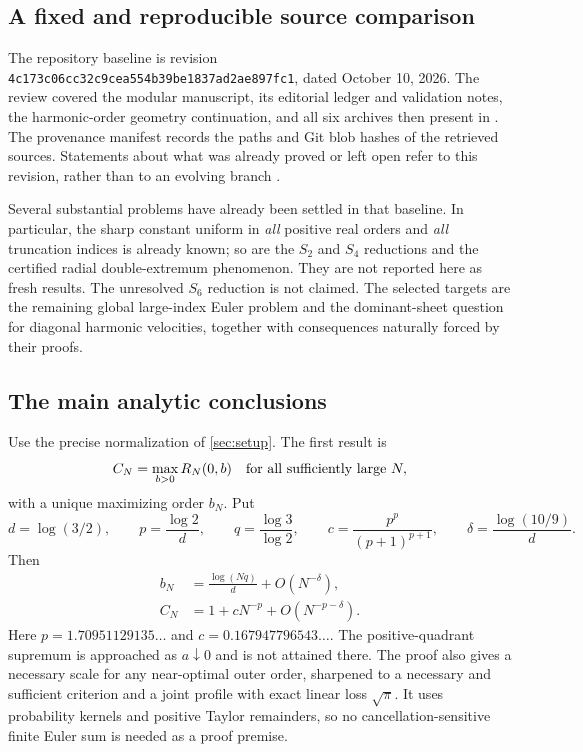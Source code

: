 \subsection{A fixed and reproducible source comparison}

The repository baseline is revision
\texttt{4c173c06cc32c9cea554b39be1837ad2ae897fc1},
dated October 10, 2026. The review covered the modular manuscript,
its editorial ledger and validation notes, the harmonic-order geometry
continuation, and all six archives then present in .
The provenance manifest records the paths and Git blob hashes of the
retrieved sources. Statements about what was already proved or left
open refer to this revision, rather than to an evolving branch
\cite{ProveItSnapshot,HarmonicBaseline,UniformBoundsIncoming,SharpEulerIncoming}.

Several substantial problems have already been settled in that baseline.
In particular, the sharp constant uniform in \emph{all} positive real
orders and \emph{all} truncation indices is already known; so are the
$S_2$ and $S_4$ reductions and the certified radial double-extremum
phenomenon. They are not reported here as fresh results. The unresolved
$S_6$ reduction is not claimed. The selected targets are the remaining
global large-index Euler problem and the dominant-sheet question for
diagonal harmonic velocities, together with consequences naturally
forced by their proofs.

\subsection{The main analytic conclusions}

Use the precise normalization of \cref{sec:setup}. The first result is
\[
 C_N=\max_{b>0}R_N(0,b)\quad\hbox{for all sufficiently large }N,
\]
with a unique maximizing order $b_N$. Put
\[
 d=\log(3/2),\qquad p=\frac{\log2}{d},\qquad
 q=\frac{\log3}{\log2},\qquad
 c=\frac{p^p}{(p+1)^{p+1}},\qquad
 \delta=\frac{\log(10/9)}d.
\]
Then
\begin{align}
 b_N&=\frac{\log(Nq)}d+O(N^{-\delta}),\label{eq:intro-b}\\
 C_N&=1+cN^{-p}+O(N^{-p-\delta}).\label{eq:intro-C}
\end{align}
Here $p=1.70951129135\ldots$ and $c=0.167947796543\ldots$.
The positive-quadrant supremum is approached as $a\downarrow0$ and is
not attained there. The proof also gives a necessary scale for any
near-optimal outer order, sharpened to a necessary and sufficient
criterion and a joint profile with exact linear loss $\sqrt\pi$.
It uses probability kernels and positive
Taylor remainders, so no cancellation-sensitive finite Euler sum is
needed as a proof premise.

